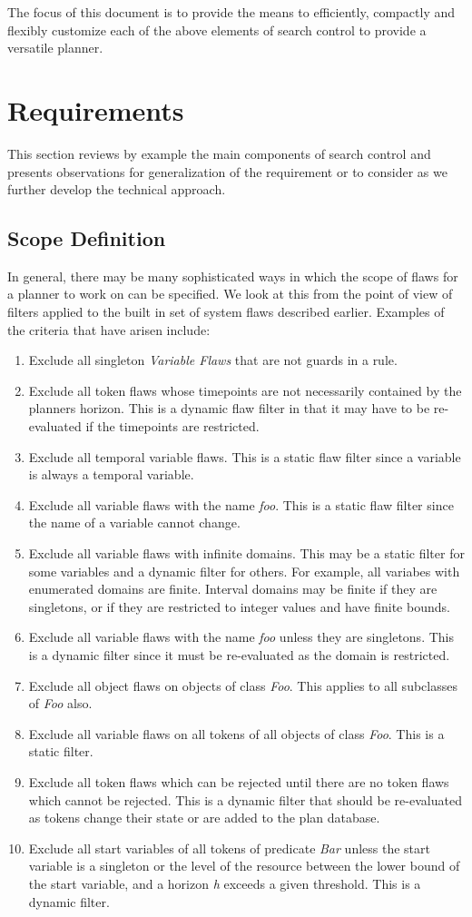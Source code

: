 \documentclass[10pt, letterpaper, oneside]{article}
\begin{document}
The focus of this document is to provide the means to efficiently, compactly and flexibly customize each of the above elements of search control to provide a versatile planner.

\section{Requirements}
This section reviews by example the main components of search control and presents observations for generalization of the requirement or to consider as we further develop the technical approach.

\subsection{Scope Definition}
In general, there may be many sophisticated ways in which the scope of flaws for a planner to work on can be specified. We look at this from the point of view of filters applied to the built in set of system flaws described earlier. Examples of the criteria that have arisen include:
\begin{enumerate}
\item Exclude all singleton {\em Variable Flaws} that are not guards in a rule.
\item Exclude all token flaws whose timepoints are not necessarily contained by the planners horizon. This is a dynamic flaw filter in that it may have to be re-evaluated if the timepoints are restricted.
\item Exclude all temporal variable flaws. This is a static flaw filter since a variable is always a temporal variable.
\item Exclude all variable flaws with the name {\em foo}. This is a static flaw filter since the name of a variable cannot change.
\item Exclude all variable flaws with infinite domains. This may be a static filter for some variables and a dynamic filter for others. For example, all variabes with enumerated domains are finite. Interval domains may be finite if they are singletons, or if they are restricted to integer values and have finite bounds.
\item Exclude all variable flaws with the name {\em foo} unless they are singletons. This is a dynamic filter since it must be re-evaluated as the domain is restricted.
\item Exclude all object flaws on objects of class {\em Foo}. This applies to all subclasses of {\em Foo} also.
\item Exclude all variable flaws on all tokens of all objects of class {\em Foo}. This is a static filter.
\item Exclude all token flaws which can be rejected until there are no token flaws which cannot be rejected. This is a dynamic filter that should be re-evaluated as tokens change their state or are added to the plan database.
\item Exclude all start variables of all tokens of predicate {\em Bar} unless the start variable is a singleton or the level of the resource between the lower bound of the start variable, and a horizon {\em h} exceeds a given threshold. This is a dynamic filter.
\end{enumerate}
\end{document}
